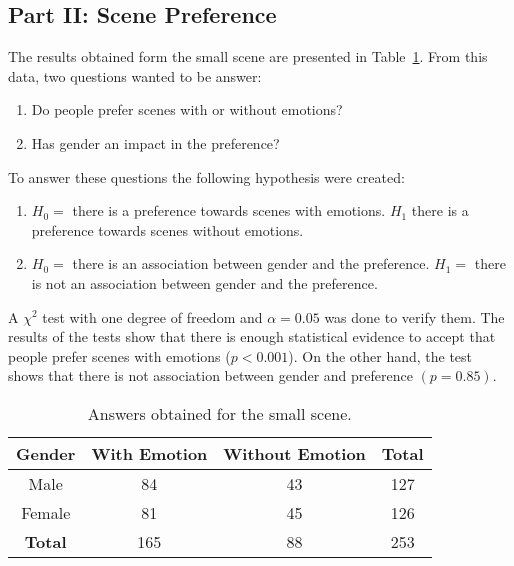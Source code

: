 \subsection{Part II: Scene Preference}

The results obtained form the small scene are presented in Table~\ref{table:preference_selection}. From this data, two questions wanted to be answer:
\begin{enumerate}
	\item Do people prefer scenes with or without emotions?
	\item Has gender an impact in the preference?
\end{enumerate}
To answer these questions the following hypothesis were created:
\begin{enumerate}
	\item $H_0 =$ there is a preference towards scenes with emotions. $H_1$ there is a preference towards scenes without emotions. 
	\item $H_0 =$ there is an association between gender and the preference. $H_1 =$ there is not an association between gender and the preference. 
\end{enumerate}
A $\chi^2$ test with one degree of freedom and $\alpha = 0.05$ was done to verify them. The results of the tests show that there is enough statistical evidence to accept that people prefer scenes with emotions ($p<0.001$). On the other hand, the test shows that there is not association between gender and preference $(p=0.85)$.

\begin{table}
\centering
		\caption{Answers obtained for the small scene.}		
		\label{table:preference_selection}
			\begin{tabular}{|c|c|c|c|}
			\hline
			\textbf{Gender}&\textbf{With Emotion}&\textbf{Without Emotion}&\textbf{Total}\\
			\hline
			Male & 84 & 43 & 127\\
			\hline
			Female & 81 & 45 & 126\\
			\hline
			\textbf{Total} & 165 & 88 & 253\\
			\hline
			\end{tabular}
\end{table}
